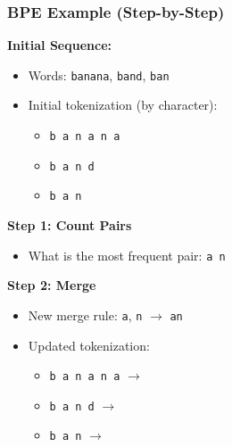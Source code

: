 \documentclass[usenames,dvipsnames,notes,11pt,aspectratio=169,hyperref={colorlinks=true, linkcolor=blue}]{beamer}
\begin{document}
\begin{frame}
\frametitle{BPE Example (Step-by-Step)}

\textbf{Initial Sequence:}\\
\begin{itemize}
    \item Words: \texttt{banana}, \texttt{band}, \texttt{ban}
    \item Initial tokenization (by character):
    \begin{itemize}
        \item \texttt{b a n a n a}
        \item \texttt{b a n d}
        \item \texttt{b a n}
    \end{itemize}
\end{itemize}

\pause
\textbf{Step 1: Count Pairs}\\
\begin{itemize}
    \item What is the most frequent pair: \pause\texttt{a n}
\end{itemize}

\pause
\textbf{Step 2: Merge}\\
\begin{itemize}
    \item New merge rule: {\tt a}, {\tt n} $\rightarrow$ \texttt{an}
    \item Updated tokenization:
    \begin{itemize}
        \item \texttt{b a n a n a} $\rightarrow$
        \item \texttt{b a n d} $\rightarrow$
        \item \texttt{b a n} $\rightarrow$
    \end{itemize}
\end{itemize}
\end{frame}
\end{document}

